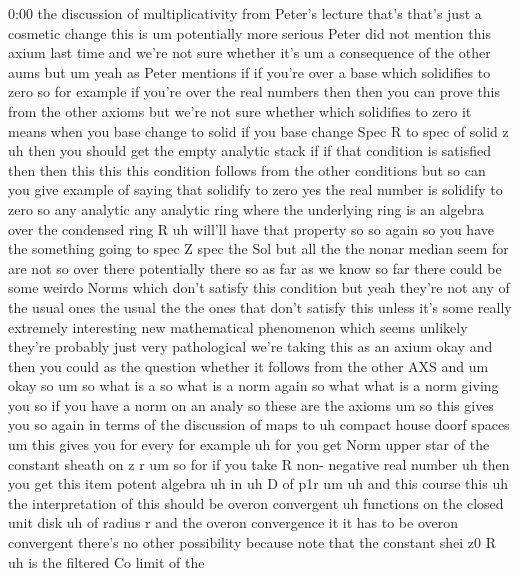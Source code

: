 \begin{unfinished}{0:00}
the  discussion  of  multiplicativity  from
Peter's  lecture  that's  that's  just  a
cosmetic  change  this  is  um  potentially
more  serious  Peter  did  not  mention  this
axium  last  time  and  we're  not  sure
whether  it's  um  a  consequence  of  the
other
aums  but  um  yeah  as  Peter  mentions  if  if
you're  over  a  base  which  solidifies  to
zero  so  for  example  if  you're  over  the
real  numbers  then  then  you  can  prove
this  from  the  other  axioms  but  we're  not
sure  whether  which  solidifies  to
zero  it  means  when  you  base  change  to
solid  if  you  base  change  Spec  R  to  spec
of  solid  z  uh  then  you  should  get  the
empty  analytic  stack  if  if  that
condition  is
satisfied  then  then  this  this  this
condition  follows  from  the  other
conditions  but  so  can  you  give  example
of  saying  that  solidify  to  zero  yes  the
real  number  is  solidify  to  zero  so  any
analytic  any  analytic  ring  where  the
underlying  ring  is  an  algebra  over  the
condensed  ring
R  uh  will'll  have  that
property  so  so  again  so  you  have  the
something  going  to  spec  Z  spec  the  Sol
but  all  the  the  nonar  median  seem  for
are
not  so  over  there  potentially  there  so
as  far  as  we  know  so  far  there  could  be
some  weirdo  Norms  which  don't  satisfy
this  condition  but  yeah  they're  not  any
of  the  usual  ones  the
usual  the  the  ones  that  don't  satisfy
this  unless  it's  some  really  extremely
interesting  new  mathematical  phenomenon
which  seems  unlikely  they're  probably
just  very  pathological  we're  taking  this
as  an  axium  okay  and  then  you  could  as
the  question  whether  it  follows  from  the
other  AXS  and
um  okay
so
um  so  what  is  a  so  what  is  a  norm  again
so  what  what  is  a  norm  giving  you  so  if
you  have  a  norm  on  an  analy  so  these  are
the
axioms
um  so  this  gives  you  so  again  in  terms
of  the  discussion  of  maps  to  uh  compact
house  doorf  spaces  um  this  gives  you  for
every  for  example  uh
for  you  get  Norm  upper  star  of  the
constant  sheath  on  z
r
um  so  for  if  you  take
R  non-  negative  real  number  uh  then  you
get  this  item  potent
algebra  uh  in  uh  D  of
p1r
um  uh  and  this  course  this  uh  the
interpretation  of  this  should  be  overon
convergent  uh
functions  on  the  closed  unit
disk  uh  of  radius
r
and  the  overon  convergence  it  it  has  to
be  overon  convergent  there's  no  other
possibility  because  note  that  the
constant  shei  z0
R  uh  is  the  filtered  Co  limit  of  the

\end{unfinished}
